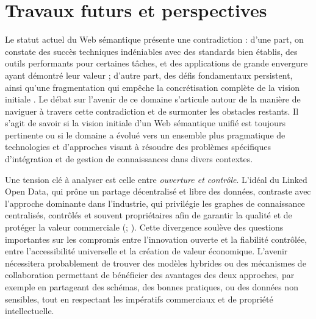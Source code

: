 \documentclass[9pt,twocolumn,twoside,french]{opticajnl}
\begin{document}
\section{Travaux futurs et perspectives}
Le statut actuel du Web sémantique présente une contradiction : d'une part, on constate des succès techniques indéniables avec des standards bien établis, des outils performants pour certaines tâches, et des applications de grande envergure ayant démontré leur valeur ; d'autre part, des défis fondamentaux persistent, ainsi qu'une fragmentation qui empêche la concrétisation complète de la vision initiale \citep{Hitzler2021}. Le débat sur l'avenir de ce domaine s'articule autour de la manière de naviguer à travers cette contradiction et de surmonter les obstacles restants. Il s'agit de savoir si la vision initiale d'un Web sémantique unifié est toujours pertinente ou si le domaine a évolué vers un ensemble plus pragmatique de technologies et d'approches visant à résoudre des problèmes spécifiques d'intégration et de gestion de connaissances dans divers contextes.

Une tension clé à analyser est celle entre \textit{ouverture et contrôle}. L'idéal du Linked Open Data, qui prône un partage décentralisé et libre des données, contraste avec l'approche dominante dans l'industrie, qui privilégie les graphes de connaissance centralisés, contrôlés et souvent propriétaires afin de garantir la qualité et de protéger la valeur commerciale (\citealp{Noy2019Industryscale}; \citealp{Hitzler2021}). Cette divergence soulève des questions importantes sur les compromis entre l'innovation ouverte et la fiabilité contrôlée, entre l'accessibilité universelle et la création de valeur économique. L'avenir nécessitera probablement de trouver des modèles hybrides ou des mécanismes de collaboration permettant de bénéficier des avantages des deux approches, par exemple en partageant des schémas, des bonnes pratiques, ou des données non sensibles, tout en respectant les impératifs commerciaux et de propriété intellectuelle.
\end{document}
